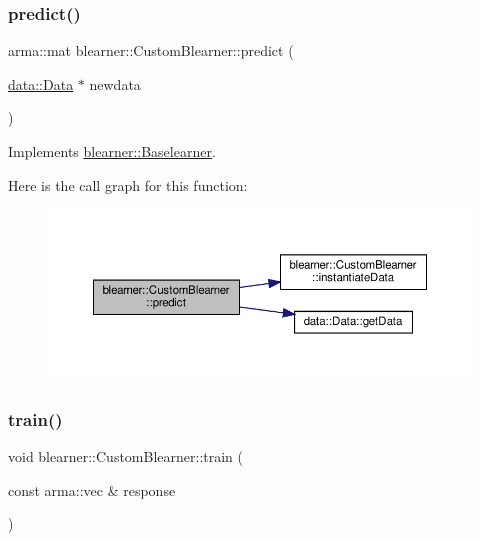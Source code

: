 \subsubsection{\texorpdfstring{predict()}{predict()}\hspace{0.1cm}{\footnotesize\ttfamily [2/2]}}
{\footnotesize\ttfamily arma\+::mat blearner\+::\+Custom\+Blearner\+::predict (\begin{DoxyParamCaption}\item[{\hyperlink{classdata_1_1_data}{data\+::\+Data} $\ast$}]{newdata }\end{DoxyParamCaption})\hspace{0.3cm}{\ttfamily [virtual]}}



Implements \hyperlink{classblearner_1_1_baselearner_ae2ef5e018783578e02b3b5a33fa94eae}{blearner\+::\+Baselearner}.

Here is the call graph for this function\+:\nopagebreak
\begin{figure}[H]
\begin{center}
\leavevmode
\includegraphics[width=350pt]{classblearner_1_1_custom_blearner_a401a479834eb3896260cb57b4551ceb4_cgraph}
\end{center}
\end{figure}
\mbox{\label{classblearner_1_1_custom_blearner_a4726c5b861b67817f7b3eb61d8f6c0d7}} 
\subsubsection{\texorpdfstring{train()}{train()}}
{\footnotesize\ttfamily void blearner\+::\+Custom\+Blearner\+::train (\begin{DoxyParamCaption}\item[{const arma\+::vec \&}]{response }\end{DoxyParamCaption})\hspace{0.3cm}{\ttfamily [virtual]}}




